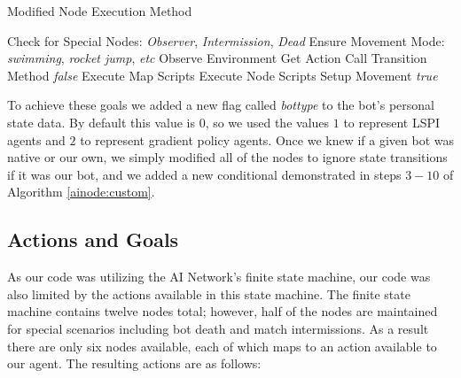 \begin{algorithm}
\caption{Modified Node Execution Method}
\label{ainode:custom}
    {\fontsize{12}{10}\selectfont
    \begin{algorithmic}[1]
        \STATE Check for Special Nodes: \emph{Observer}, \emph{Intermission}, \emph{Dead}
        \STATE Ensure Movement Mode: \emph{swimming}, \emph{rocket jump}, \emph{etc}
            \STATE Observe Environment
            \STATE Get Action
                \STATE Call Transition Method
                \RETURN \emph{false}
            \ENDIF
        \ENDIF
        \STATE Execute Map Scripts
        \STATE Execute Node Scripts
        \STATE Setup Movement
        \RETURN \emph{true}
    \end{algorithmic}
    }
\end{algorithm}

To achieve these goals we added a new flag called \emph{bottype} to the bot's personal state data. By default this value is $0$, so we used the values $1$ to represent LSPI agents and $2$ to represent gradient policy agents. Once we knew if a given bot was native or our own, we simply modified all of the nodes to ignore state transitions if it was our bot, and we added a new conditional demonstrated in steps $3-10$ of Algorithm \ref{ainode:custom}.

\subsection{Actions and Goals}

As our code was utilizing the AI Network's finite state machine, our code was also limited by the actions available in this state machine. The finite state machine contains twelve nodes total; however, half of the nodes are maintained for special scenarios including bot death and match intermissions. As a result there are only six nodes available, each of which maps to an action available to our agent. The resulting actions are as follows:

